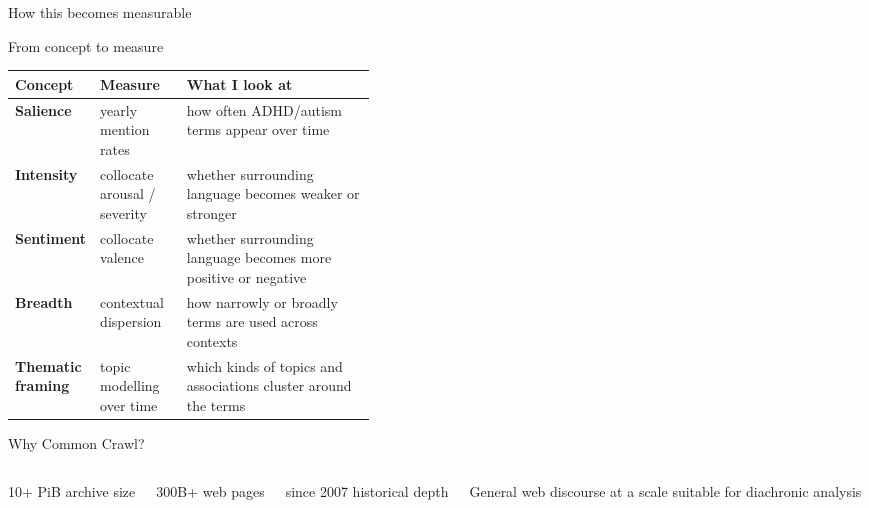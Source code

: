 \documentclass[11pt,notheorems,aspectratio=169]{beamer}
\begin{document}
	\begin{frame}{How this becomes measurable}
		\begin{block}{From concept to measure}
			\small
			\renewcommand{\arraystretch}{1.25}
			\begin{tabularx}{\linewidth}{>{\bfseries}p{0.18\linewidth} p{0.24\linewidth} X}
				\toprule
				Concept & Measure & What I look at \\
				\midrule
				Salience & yearly mention rates & how often ADHD/autism terms appear over time \\
				Intensity & collocate arousal / severity & whether surrounding language becomes weaker or stronger \\
				Sentiment & collocate valence & whether surrounding language becomes more positive or negative \\
				Breadth & contextual dispersion & how narrowly or broadly terms are used across contexts \\
				Thematic framing & topic modelling over time & which kinds of topics and associations cluster around the terms \\
				\bottomrule
			\end{tabularx}
		\end{block}
	\end{frame}
	
	\begin{frame}{Why Common Crawl?}
		\begin{columns}[T,onlytextwidth]
			\begin{columns}[T,onlytextwidth]
				\begin{exampleblock}{\centering \Large 10+ PiB}
					\centering
					\small archive size
				\end{exampleblock}
				\begin{exampleblock}{\centering \Large 300B+}
					\centering
					\small web pages
				\end{exampleblock}
				\begin{exampleblock}{\centering \Large since 2007}
					\centering
					\small historical depth
				\end{exampleblock}
			\end{columns}
			
			\vspace{0.9em}
			
			\begin{center}
				\large General web discourse at a scale suitable for diachronic analysis
			\end{center}
		\end{columns}
	\end{frame}
	
\end{document}
